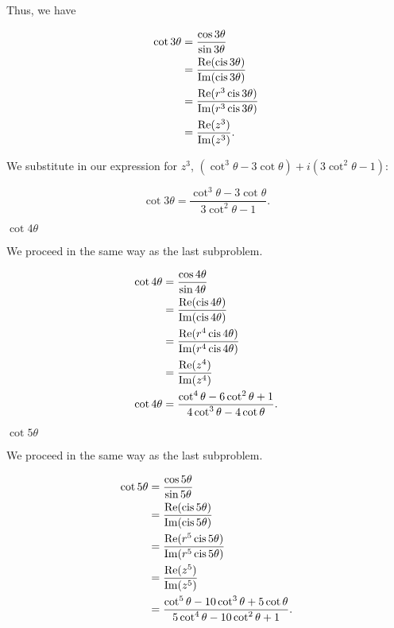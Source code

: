 \documentclass[../gatm_answers.tex]{subfiles}
\begin{document}
Thus, we have

\begin{align*}
\cot 3\theta &= \frac{\cos 3\theta}{\sin 3\theta} \\
&= \frac{\operatorname{Re}(\operatorname{cis} 3\theta)}{\operatorname{Im}(\operatorname{cis} 3\theta)} \\
&= \frac{\operatorname{Re}(r^3\operatorname{cis} 3\theta)}{\operatorname{Im}(r^3\operatorname{cis} 3\theta)} \\
&= \frac{\operatorname{Re}(z^3)}{\operatorname{Im}(z^3)}.
\end{align*}

We substitute in our expression for $z^3$, $(\cot^3\theta - 3\cot\theta) + i(3\cot^2\theta - 1)$:

$$\cot 3\theta = \frac{\cot^3\theta - 3\cot\theta}{3\cot^2\theta - 1}.$$

\begin{iinner_problem}[start=1]
\item $\cot 4\theta$
\end{iinner_problem}

We proceed in the same way as the last subproblem.

\begin{align*}
\cot 4\theta &= \frac{\cos 4\theta}{\sin 4\theta} \\ 
&= \frac{\operatorname{Re}(\operatorname{cis} 4\theta)}{\operatorname{Im}(\operatorname{cis} 4\theta)} \\
&= \frac{\operatorname{Re}(r^4\operatorname{cis} 4\theta)}{\operatorname{Im}(r^4\operatorname{cis} 4\theta)} \\
&= \frac{\operatorname{Re}(z^4)}{\operatorname{Im}(z^4)} \\
\cot 4\theta &= \frac{\cot^4\theta - 6\cot^2\theta + 1}{4\cot^3 \theta - 4\cot\theta}. \\
\end{align*}

\begin{iinner_problem}[start=1]
\item $\cot 5\theta$
\end{iinner_problem}

We proceed in the same way as the last subproblem.

\begin{align*}
\cot 5\theta &= \frac{\cos 5\theta}{\sin 5\theta}  \\
&= \frac{\operatorname{Re}(\operatorname{cis} 5\theta)}{\operatorname{Im}(\operatorname{cis} 5\theta)} \\
&= \frac{\operatorname{Re}(r^5\operatorname{cis} 5\theta)}{\operatorname{Im}(r^5\operatorname{cis} 5\theta)} \\
&= \frac{\operatorname{Re}(z^5)}{\operatorname{Im}(z^5)} \\
&= \frac{\cot^5\theta - 10\cot^3\theta + 5\cot\theta}{5\cot^4\theta - 10\cot^2\theta + 1}.
\end{align*}
\end{document}
